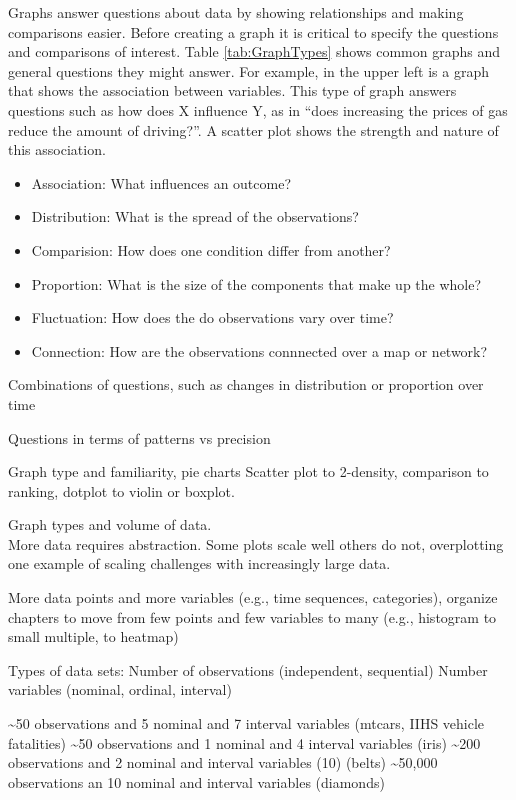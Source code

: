 \documentclass[]{krantz}
\providecommand{\tightlist}{%
  \setlength{\itemsep}{0pt}\setlength{\parskip}{0pt}}
\theoremstyle{definition}
\theoremstyle{definition}
\theoremstyle{definition}
\theoremstyle{remark}
\begin{document}
Graphs answer questions about data by showing relationships and making
comparisons easier. Before creating a graph it is critical to specify
the questions and comparisons of interest. Table \ref{tab:GraphTypes}
shows common graphs and general questions they might answer. For
example, in the upper left is a graph that shows the association between
variables. This type of graph answers questions such as how does X
influence Y, as in ``does increasing the prices of gas reduce the amount
of driving?''. A scatter plot shows the strength and nature of this
association.

\begin{itemize}
\tightlist
\item
  Association: What influences an outcome?
\item
  Distribution: What is the spread of the observations?
\item
  Comparision: How does one condition differ from another?
\item
  Proportion: What is the size of the components that make up the whole?
\item
  Fluctuation: How does the do observations vary over time?
\item
  Connection: How are the observations connnected over a map or network?
\end{itemize}

Combinations of questions, such as changes in distribution or proportion
over time

Questions in terms of patterns vs precision

Graph type and familiarity, pie charts Scatter plot to 2-density,
comparison to ranking, dotplot to violin or boxplot.

Graph types and volume of data.\\
More data requires abstraction. Some plots scale well others do not,
overplotting one example of scaling challenges with increasingly large
data.

More data points and more variables (e.g., time sequences, categories),
organize chapters to move from few points and few variables to many
(e.g., histogram to small multiple, to heatmap)

Types of data sets: Number of observations (independent, sequential)
Number variables (nominal, ordinal, interval)

\textasciitilde{}50 observations and 5 nominal and 7 interval variables
(mtcars, IIHS vehicle fatalities) \textasciitilde{}50 observations and 1
nominal and 4 interval variables (iris) \textasciitilde{}200
observations and 2 nominal and interval variables (10) (belts)
\textasciitilde{}50,000 observations an 10 nominal and interval
variables (diamonds)
\end{document}
